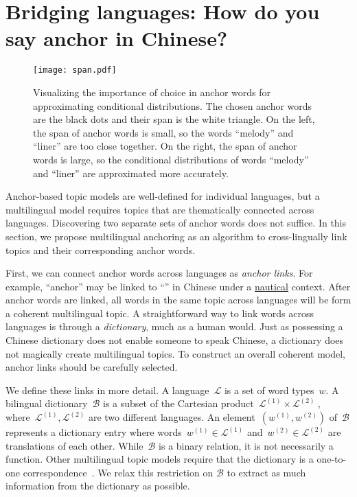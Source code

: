 

\section{Bridging languages: How do you say anchor in Chinese?}
\label{sec:mtanchor}


\begin{figure}
  \centering
  \texttt{[image: span.pdf]}
  \caption{Visualizing the importance of choice in anchor words for approximating conditional distributions.  The chosen anchor words are the black dots and their span is the white triangle.  On the left, the span of anchor words is small, so the words ``melody'' and ``liner'' are too close together.  On the right, the span of anchor words is large, so the conditional distributions of words ``melody'' and ``liner'' are approximated more accurately.}
  \label{fig:span}
\end{figure}

Anchor-based topic models are well-defined for individual languages, but a
multilingual model requires topics that are thematically connected across languages.  Discovering two separate sets of anchor words does not suffice.
In this section, we propose multilingual anchoring as an algorithm to cross-lingually link topics and their corresponding anchor words.


First, we can connect anchor words across languages as \emph{anchor links}.  For example,
``anchor'' may be linked to ``'' in Chinese under a
\underline{nautical} context.  After anchor words are linked, all words in the same topic across languages will be form a coherent multilingual topic. A straightforward way to link words across
languages is through a \emph{dictionary}, much as a human would.
Just as possessing a Chinese dictionary does not enable someone to speak Chinese, a dictionary does not magically create multilingual topics.  To construct an overall coherent model, anchor links should be carefully selected.

We define these links in more detail.  A language~$\mathcal{L}$ is a
set of word types~$w$.   A bilingual dictionary~$\mathcal{B}$ is a subset of the Cartesian product~$\mathcal{L}^{(1)} \times \mathcal{L}^{(2)}~$, 
where~$\mathcal{L}^{(1)}, \mathcal{L}^{(2)}$ are two different languages.  An element~$(w^{(1)}, w^{(2)})$
of~$\mathcal{B}$ represents a dictionary entry where words~$w^{(1)} \in \mathcal{L}^{(1)}$
and~$w^{(2)} \in \mathcal{L}^{(2)}$ are translations of each other. While~$\mathcal{B}$ is a
binary relation, it is not necessarily a function.  Other multilingual
topic models require that the dictionary is a one-to-one
correspondence~\cite{jagarlamudi-2010,
  boyd-graber-2009,gutierrez-2016}.  We relax this restriction on
$\mathcal{B}$ to extract as much information from the
dictionary as possible.

